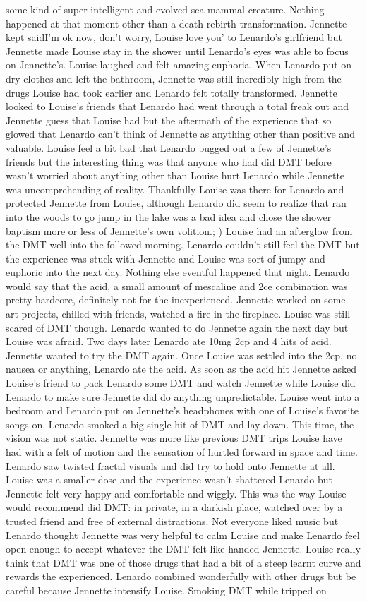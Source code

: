 \documentclass[12pt]{book}
\begin{document}
some kind of super-intelligent and evolved sea mammal creature. Nothing happened at that moment other than a death-rebirth-transformation. Jennette kept saidI'm ok now, don't worry, Louise love you' to Lenardo's girlfriend but Jennette made Louise stay in the shower until Lenardo's eyes was able to focus on Jennette's. Louise laughed and felt amazing euphoria. When Lenardo put on dry clothes and left the bathroom, Jennette was still incredibly high from the drugs Louise had took earlier and Lenardo felt totally transformed. Jennette looked to Louise's friends that Lenardo had went through a total freak out and Jennette guess that Louise had but the aftermath of the experience that so glowed that Lenardo can't think of Jennette as anything other than positive and valuable. Louise feel a bit bad that Lenardo bugged out a few of Jennette's friends but the interesting thing was that anyone who had did DMT before wasn't worried about anything other than Louise hurt Lenardo while Jennette was uncomprehending of reality. Thankfully Louise was there for Lenardo and protected Jennette from Louise, although Lenardo did seem to realize that ran into the woods to go jump in the lake was a bad idea and chose the shower baptism more or less of Jennette's own volition.; ) Louise had an afterglow from the DMT well into the followed morning. Lenardo couldn't still feel the DMT but the experience was stuck with Jennette and Louise was sort of jumpy and euphoric into the next day. Nothing else eventful happened that night. Lenardo would say that the acid, a small amount of mescaline and 2ce combination was pretty hardcore, definitely not for the inexperienced. Jennette worked on some art projects, chilled with friends, watched a fire in the fireplace. Louise was still scared of DMT though. Lenardo wanted to do Jennette again the next day but Louise was afraid. Two days later Lenardo ate 10mg 2cp and 4 hits of acid. Jennette wanted to try the DMT again. Once Louise was settled into the 2cp, no nausea or anything, Lenardo ate the acid. As soon as the acid hit Jennette asked Louise's friend to pack Lenardo some DMT and watch Jennette while Louise did Lenardo to make sure Jennette did do anything unpredictable. Louise went into a bedroom and Lenardo put on Jennette's headphones with one of Louise's favorite songs on. Lenardo smoked a big single hit of DMT and lay down. This time, the vision was not static. Jennette was more like previous DMT trips Louise have had with a felt of motion and the sensation of hurtled forward in space and time. Lenardo saw twisted fractal visuals and did try to hold onto Jennette at all. Louise was a smaller dose and the experience wasn't shattered Lenardo but Jennette felt very happy and comfortable and wiggly. This was the way Louise would recommend did DMT: in private, in a darkish place, watched over by a trusted friend and free of external distractions. Not everyone liked music but Lenardo thought Jennette was very helpful to calm Louise and make Lenardo feel open enough to accept whatever the DMT felt like handed Jennette. Louise really think that DMT was one of those drugs that had a bit of a steep learnt curve and rewards the experienced. Lenardo combined wonderfully with other drugs but be careful because Jennette intensify Louise. Smoking DMT while tripped on 
\end{document}
